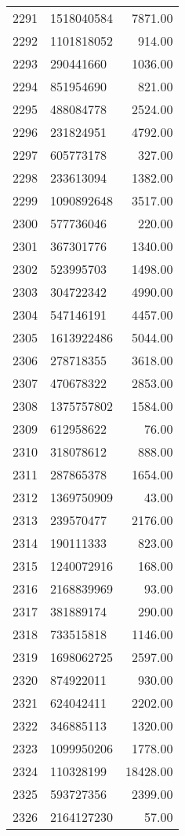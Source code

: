 \begin{table}[ht]
\begin{tabular}{rlr}
  2291 & 1518040584 & 7871.00 \\ 
  2292 & 1101818052 & 914.00 \\ 
  2293 & 290441660 & 1036.00 \\ 
  2294 & 851954690 & 821.00 \\ 
  2295 & 488084778 & 2524.00 \\ 
  2296 & 231824951 & 4792.00 \\ 
  2297 & 605773178 & 327.00 \\ 
  2298 & 233613094 & 1382.00 \\ 
  2299 & 1090892648 & 3517.00 \\ 
  2300 & 577736046 & 220.00 \\ 
  2301 & 367301776 & 1340.00 \\ 
  2302 & 523995703 & 1498.00 \\ 
  2303 & 304722342 & 4990.00 \\ 
  2304 & 547146191 & 4457.00 \\ 
  2305 & 1613922486 & 5044.00 \\ 
  2306 & 278718355 & 3618.00 \\ 
  2307 & 470678322 & 2853.00 \\ 
  2308 & 1375757802 & 1584.00 \\ 
  2309 & 612958622 & 76.00 \\ 
  2310 & 318078612 & 888.00 \\ 
  2311 & 287865378 & 1654.00 \\ 
  2312 & 1369750909 & 43.00 \\ 
  2313 & 239570477 & 2176.00 \\ 
  2314 & 190111333 & 823.00 \\ 
  2315 & 1240072916 & 168.00 \\ 
  2316 & 2168839969 & 93.00 \\ 
  2317 & 381889174 & 290.00 \\ 
  2318 & 733515818 & 1146.00 \\ 
  2319 & 1698062725 & 2597.00 \\ 
  2320 & 874922011 & 930.00 \\ 
  2321 & 624042411 & 2202.00 \\ 
  2322 & 346885113 & 1320.00 \\ 
  2323 & 1099950206 & 1778.00 \\ 
  2324 & 110328199 & 18428.00 \\ 
  2325 & 593727356 & 2399.00 \\ 
  2326 & 2164127230 & 57.00 \\ 

\end{tabular}
\end{table}
